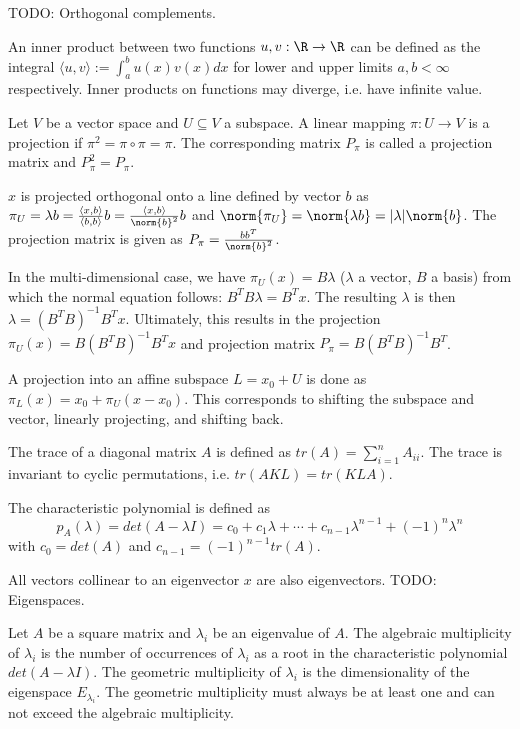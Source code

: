 TODO: Orthogonal complements.

An inner product between two functions $u, v : \R \to \R$ can be defined as the integral
$\langle u, v \rangle := \int_a^b{u(x) v(x) dx}$ for lower and upper limits $a, b < \infty$ respectively.
Inner products on functions may diverge, i.e. have infinite value.

Let $V$ be a vector space and $U \subseteq V$ a subspace.
A linear mapping $\pi : U \to V$ is a projection if $\pi^2 = \pi \circ \pi = \pi$.
The corresponding matrix $P_\pi$ is called a projection matrix and $P_\pi^2 = P_\pi$.

$x$ is projected orthogonal onto a line defined by vector $b$ as
$\pi_U = \lambda b = \frac{\langle x, b \rangle}{\langle b, b \rangle} b = \frac{\langle x, b \rangle}{\norm{b}^2} b$
and $\norm{\pi_U} = \norm{\lambda b} = |\lambda| \norm{b}$.
The projection matrix is given as
$P_\pi = \frac{b b^T}{\norm{b}^2}$.

In the multi-dimensional case, we have $\pi_U(x) = B \lambda$ ($\lambda$ a vector, $B$ a basis)
from which the normal equation follows:
$B^T B \lambda = B^T x$.
The resulting $\lambda$ is then $\lambda = (B^T B)^{-1} B^T x$.
Ultimately, this results in the projection
$\pi_U(x) = B (B^T B)^{-1}B^T x$ and projection matrix
$P_\pi = B (B^T B)^{-1} B^T$.

A projection into an affine subspace $L = x_0 + U$ is done as
$\pi_L(x) = x_0 + \pi_U(x - x_0)$.
This corresponds to shifting the subspace and vector, linearly projecting, and shifting back.

The trace of a diagonal matrix $A$ is defined as $tr(A) = \sum_{i=1}^n{A_{ii}}$.
The trace is invariant to cyclic permutations, i.e. $tr(AKL) = tr(KLA)$.

The characteristic polynomial is defined as
\begin{equation*}
    p_A(\lambda) = det(A - \lambda I) = c_0 + c_1 \lambda + \dotsb + c_{n-1} \lambda^{n-1} + (-1)^n \lambda^n
\end{equation*}
with $c_0 = det(A)$ and $c_{n-1} = (-1)^{n-1} tr(A)$.

All vectors collinear to an eigenvector $x$ are also eigenvectors.
TODO: Eigenspaces.

Let $A$ be a square matrix and $\lambda_i$ be an eigenvalue of $A$.
The algebraic multiplicity of $\lambda_i$ is the number of occurrences of $\lambda_i$ as a root in
the characteristic polynomial $det(A - \lambda I)$.
The geometric multiplicity of $\lambda_i$ is the dimensionality of the eigenspace $E_{\lambda_i}$.
The geometric multiplicity must always be at least one and can not exceed the algebraic multiplicity.

